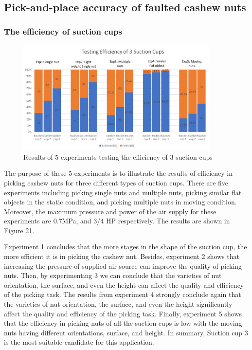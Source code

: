 \documentclass[10pt, letterpaper]{article}
\begin{document}
\subsection{Pick-and-place accuracy of faulted cashew nuts}

\subsubsection*{The efficiency of suction cups}
    \begin{figure}[h]
        \centering
        \includegraphics[width=0.9\textwidth]{fig22.JPG}
        \caption{Results of 5 experiments testing the efficiency of 3 suction cups}
    \end{figure}
    The purpose of these 5 experiments is to illustrate the results of efficiency in picking cashew nuts for three different types of suction cups. There are five experiments including picking single nuts and multiple nuts, picking similar flat objects in the static condition, and picking multiple nuts in moving condition. Moreover, the maximum pressure and power of the air supply for these experiments are 0.7MPa, and 3/4 HP respectively. The results are shown in Figure 21.\par
    Experiment 1 concludes that the more stages in the shape of the suction cup, the more efficient it is in picking the cashew nut. Besides, experiment 2 shows that increasing the pressure of supplied air source can improve the quality of picking nuts. Then, by experimenting 3 we can conclude that the varieties of nut orientation, the surface, and even the height can affect the quality and efficiency of the picking task. The results from experiment 4 strongly conclude again that the varieties of nut orientation, the surface, and even the height significantly affect the quality and efficiency of the picking task. Finally, experiment 5 shows that the efficiency in picking nuts of all the suction cups is low with the moving nuts having different orientations, surface, and height. In summary, Suction cup 3 is the most suitable candidate for this application.\par
\end{document}
